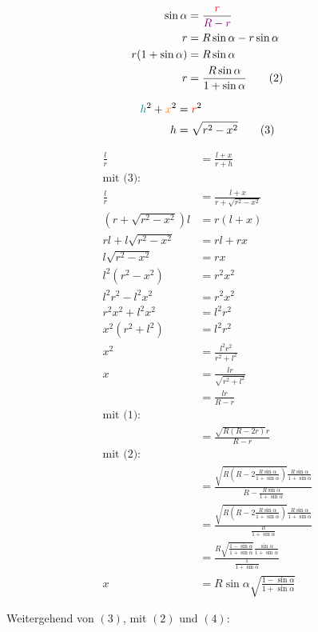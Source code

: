 \documentclass[12pt,a4paper,oneside]{article}
\begin{document}
\begin{align*}
	\sin\alpha &= \frac{ \textcolor{red}{r} }{ \textcolor{violet}{R-r} } \\
	r &= R\sin\alpha - r\sin\alpha \\
	r(1+\sin\alpha) &= R\sin\alpha \\
	r &= \frac{R\sin\alpha}{1+\sin\alpha} \tag{2}
\end{align*}

\begin{align*}
	\textcolor{teal}{h}^2 + \textcolor{orange}{x}^2 &= \textcolor{red}{r}^2 \\
	h &= \sqrt{r^2-x^2} \tag{3}
\end{align*}

\begin{align*}
	\frac{l}{r} &= \frac{l+x}{r+h} \\
	\text{mit (3):} \\
	\frac{l}{r} &= \frac{l+x}{r+\sqrt{r^2-x^2}} \\
	(r+\sqrt{r^2-x^2})l &= r(l+x) \\
	rl + l\sqrt{r^2-x^2} &= rl+rx \\
	l\sqrt{r^2-x^2} &= rx \\
	l^2(r^2-x^2) &= r^2 x^2 \\
	l^2 r^2 - l^2 x^2 &= r^2 x^2 \\
	r^2 x^2 + l^2 x^2 &= l^2 r^2 \\
	x^2 (r^2+l^2) &= l^2 r^2 \\
	x^2 &= \frac{l^2 r^2}{r^2 + l^2} \\
	x &= \frac{lr}{\sqrt{r^2+l^2}} \\
	&= \frac{lr}{R-r} \\
	\text{mit (1):} \\
	&= \frac{\sqrt{R(R-2r)}r}{R-r} \\
	\text{mit (2):} \\
	&= \frac{\sqrt{R(R-2\frac{R\sin\alpha}{1+\sin\alpha})}\frac{R\sin\alpha}{1+\sin\alpha}}{R-\frac{R\sin\alpha}{1+\sin\alpha}} \\
	&= \frac{\sqrt{R(R-2\frac{R\sin\alpha}{1+\sin\alpha})}\frac{R\sin\alpha}{1+\sin\alpha}}{\frac{R}{1+\sin\alpha}} \\
	&= \frac{R\sqrt{\frac{1-\sin\alpha}{1+\sin\alpha}}\frac{\sin\alpha}{1+\sin\alpha}}{\frac{1}{1+\sin\alpha}} \\
	x &= R\sin\alpha\sqrt{\frac{1-\sin\alpha}{1+\sin\alpha}} \tag{4}
\end{align*}

Weitergehend von $(3)$, mit $(2)$ und $(4)$:
\end{document}
